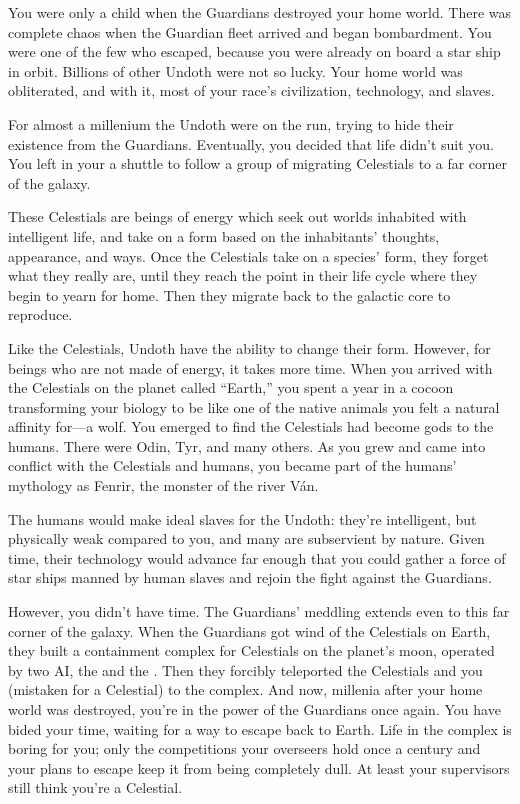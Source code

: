 \documentclass[char]{guardians}
\begin{document}

You were only a child when the Guardians destroyed your home world. There was complete chaos when the Guardian fleet arrived and began bombardment. You were one of the few who escaped, because you were already on board a star ship in orbit. Billions of other Undoth were not so lucky. Your home world was obliterated, and with it, most of your race's civilization, technology, and slaves.

For almost a millenium the Undoth were on the run, trying to hide their existence from the Guardians. Eventually, you decided that life didn't suit you. You left in your a shuttle to follow a group of migrating Celestials to a far corner of the galaxy.

These Celestials are beings of energy which seek out worlds inhabited with intelligent life, and take on a form based on the inhabitants' thoughts, appearance, and ways. Once the Celestials take on a species' form, they forget what they really are, until they reach the point in their life cycle where they begin to yearn for home. Then they migrate back to the galactic core to reproduce.

Like the Celestials, Undoth have the ability to change their form. However, for beings who are not made of energy, it takes more time. When you arrived with the Celestials on the planet called ``Earth,'' you spent a year in a cocoon transforming your biology to be like one of the native animals you felt a natural affinity for---a wolf. You emerged to find the Celestials had become gods to the humans. There were Odin, Tyr, and many others. As you grew and came into conflict with the Celestials and humans, you became part of the humans' mythology as Fenrir, the monster of the river V\'an.

The humans would make ideal slaves for the Undoth: they're intelligent, but physically weak compared to you, and many are subservient by nature. Given time, their technology would advance far enough that you could gather a force of star ships manned by human slaves and rejoin the fight against the Guardians.

However, you didn't have time. The Guardians' meddling extends even to this far corner of the galaxy. When the Guardians got wind of the Celestials on Earth, they built a containment complex for Celestials on the planet's moon, operated by two AI, the \cWarden{} and the \cCaretaker{}. Then they forcibly teleported the Celestials and you (mistaken for a Celestial) to the complex. And now, millenia after your home world was destroyed, you're in the power of the Guardians once again. You have bided your time, waiting for a way to escape back to Earth. Life in the complex is boring for you; only the competitions your overseers hold once a century and your plans to escape keep it from being completely dull. At least your supervisors still think you're a Celestial.
\end{document}
